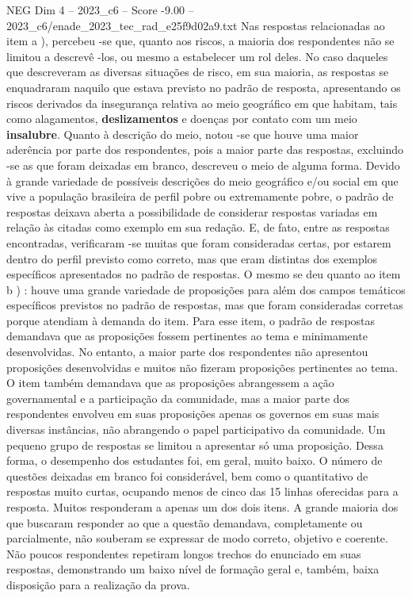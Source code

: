 \begin{textsample}{NEG Dim 4 – 2023\_c6 – Score -9.00 – 2023\_c6/enade\_2023\_tec\_rad\_e25f9d02a9.txt}
Nas respostas relacionadas ao item a ), percebeu -se que, quanto aos riscos, a maioria dos respondentes não se limitou a descrevê -los, ou mesmo a estabelecer um rol deles.
No caso daqueles que descreveram as diversas situações de risco, em sua maioria, as respostas se enquadraram naquilo que estava previsto no padrão de resposta, apresentando os riscos derivados da insegurança relativa ao meio geográfico em que habitam, tais como alagamentos, \textbf{deslizamentos} e doenças por contato com um meio \textbf{insalubre}.
Quanto à descrição do meio, notou -se que houve uma maior aderência por parte dos respondentes, pois a maior parte das respostas, excluindo -se as que foram deixadas em branco, descreveu o meio de alguma forma.
Devido à grande variedade de possíveis descrições do meio geográfico e/ou social em que vive a população brasileira de perfil pobre ou extremamente pobre, o padrão de respostas deixava aberta a possibilidade de considerar respostas variadas em relação às citadas como exemplo em sua redação.
E, de fato, entre as respostas encontradas, verificaram -se muitas que foram consideradas certas, por estarem dentro do perfil previsto como correto, mas que eram distintas dos exemplos específicos apresentados no padrão de respostas.
O mesmo se deu quanto ao item b ) : houve uma grande variedade de proposições para além dos campos temáticos específicos previstos no padrão de respostas, mas que foram consideradas corretas porque atendiam à demanda do item.
Para esse item, o padrão de respostas demandava que as proposições fossem pertinentes ao tema e minimamente desenvolvidas.
No entanto, a maior parte dos respondentes não apresentou proposições desenvolvidas e muitos não fizeram proposições pertinentes ao tema.
O item também demandava que as proposições abrangessem a ação governamental e a participação da comunidade, mas a maior parte dos respondentes envolveu em suas proposições apenas os governos em suas mais diversas instâncias, não abrangendo o papel participativo da comunidade.
Um pequeno grupo de respostas se limitou a apresentar só uma proposição.
Dessa forma, o desempenho dos estudantes foi, em geral, muito baixo.
O número de questões deixadas em branco foi considerável, bem como o quantitativo de respostas muito curtas, ocupando menos de cinco das 15 linhas oferecidas para a resposta.
Muitos responderam a apenas um dos dois itens.
A grande maioria dos que buscaram responder ao que a questão demandava, completamente ou parcialmente, não souberam se expressar de modo correto, objetivo e coerente.
Não poucos respondentes repetiram longos trechos do enunciado em suas respostas, demonstrando um baixo nível de formação geral e, também, baixa disposição para a realização da prova.

\end{textsample}
